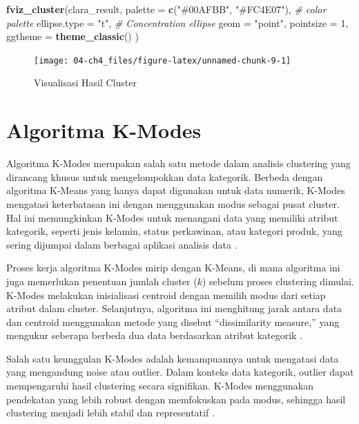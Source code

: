 \documentclass[
  oneside]{book}
\newenvironment{Shaded}{\begin{snugshade}}{\end{snugshade}}
\newcommand{\AttributeTok}[1]{\textcolor[rgb]{0.13,0.29,0.53}{#1}}
\newcommand{\CommentTok}[1]{\textcolor[rgb]{0.56,0.35,0.01}{\textit{#1}}}
\newcommand{\DecValTok}[1]{\textcolor[rgb]{0.00,0.00,0.81}{#1}}
\newcommand{\FunctionTok}[1]{\textcolor[rgb]{0.13,0.29,0.53}{\textbf{#1}}}
\newcommand{\NormalTok}[1]{#1}
\newcommand{\StringTok}[1]{\textcolor[rgb]{0.31,0.60,0.02}{#1}}
\begin{document}
\begin{Shaded}
\begin{Highlighting}[]
\FunctionTok{fviz\_cluster}\NormalTok{(clara\_result,}
\AttributeTok{palette =} \FunctionTok{c}\NormalTok{(}\StringTok{"\#00AFBB"}\NormalTok{, }\StringTok{"\#FC4E07"}\NormalTok{), }\CommentTok{\# color palette}
\AttributeTok{ellipse.type =} \StringTok{"t"}\NormalTok{, }\CommentTok{\# Concentration ellipse}
\AttributeTok{geom =} \StringTok{"point"}\NormalTok{, }\AttributeTok{pointsize =} \DecValTok{1}\NormalTok{,}
\AttributeTok{ggtheme =} \FunctionTok{theme\_classic}\NormalTok{()}
\NormalTok{)}
\end{Highlighting}
\end{Shaded}

\begin{figure}[h]

{\centering \texttt{[image: 04-ch4\_files/figure-latex/unnamed-chunk-9-1]} 

}

\caption{Visualisasi Hasil Cluster}\label{fig:unnamed-chunk-9}
\end{figure}

\chapter{Algoritma K-Modes}\label{kmods}

Algoritma K-Modes merupakan salah satu metode dalam analisis clustering
yang dirancang khusus untuk mengelompokkan data kategorik. Berbeda
dengan algoritma K-Means yang hanya dapat digunakan untuk data numerik,
K-Modes mengatasi keterbatasan ini dengan menggunakan modus sebagai
pusat cluster. Hal ini memungkinkan K-Modes untuk menangani data yang
memiliki atribut kategorik, seperti jenis kelamin, status perkawinan,
atau kategori produk, yang sering dijumpai dalam berbagai aplikasi
analisis data \citep{handayani2020}.

Proses kerja algoritma K-Modes mirip dengan K-Means, di mana algoritma
ini juga memerlukan penentuan jumlah cluster (\(k\)) sebelum proses
clustering dimulai. K-Modes melakukan inisialisasi centroid dengan
memilih modus dari setiap atribut dalam cluster. Selanjutnya, algoritma
ini menghitung jarak antara data dan centroid menggunakan metode yang
disebut ``dissimilarity measure,'' yang mengukur seberapa berbeda dua data
berdasarkan atribut kategorik \citep{buulolo2020}.

Salah satu keunggulan K-Modes adalah kemampuannya untuk mengatasi data
yang mengandung noise atau outlier. Dalam konteks data kategorik,
outlier dapat mempengaruhi hasil clustering secara signifikan. K-Modes
menggunakan pendekatan yang lebih robust dengan memfokuskan pada modus,
sehingga hasil clustering menjadi lebih stabil dan representatif
\citep{hardandy2017}.
\end{document}
